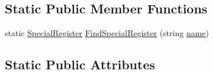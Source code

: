 \subsection*{Static Public Member Functions}
\begin{DoxyCompactItemize}
\item 
static \hyperlink{class_c_p_u___o_s___simulator_1_1_c_p_u_1_1_special_register}{Special\+Register} \hyperlink{class_c_p_u___o_s___simulator_1_1_c_p_u_1_1_special_register_aa8c2e88c7311076eb6fd42ecb5d64e38}{Find\+Special\+Register} (string \hyperlink{class_c_p_u___o_s___simulator_1_1_c_p_u_1_1_special_register_ac521aef66f5fe6a88486e70f5ade8326}{name})
\end{DoxyCompactItemize}
\subsection*{Static Public Attributes}
